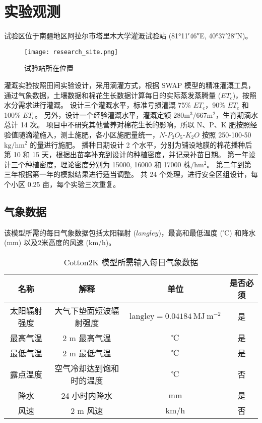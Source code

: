 \section{实验观测}
试验区位于南疆地区阿拉尔市塔里木大学灌溉试验站 (\ang{81;11;46}E, \ang{40;37;28}N)。
\begin{figure}
    \centering
    \texttt{[image: research\_site.png]}
    \caption{试验站所在位置}
\end{figure}
灌溉实验按照田间实验设计，采用滴灌方式，根据 SWAP 模型\cite{swap2021}的精准灌溉工具，通过气象数据，土壤数据和棉花生长数据计算每日的实际蒸发蒸腾量 ($ET_c$)，按照水分需求进行灌溉。
设计三个灌溉水平，标准亏损灌溉 75\% $ET_c$，90\% $ET_c$ 和 100\% $ET_c$。
另外，设计一个经验灌溉水平，灌溉定额 $\mathrm{280 m^3 / 667m^2}$，生育期滴水总计 14 次。
项目中不研究其他营养对棉花生长的影响，所以 N、P、K 肥按照经验值随滴灌施入，测土施肥，各小区施肥量统一，$N$-$P_2O_5$-$K_2O$ 按照 250-100-50 $\mathrm{kg/hm^2}$ 的量进行施肥。
播种日期设计 2 个水平，分别为铺设地膜的棉花播种后第 10 和 15 天，根据出苗率补充到设计的种植密度，并记录补苗日期。
第一年设计三个种植密度，理论密度分别为 15000, 16000 和 17000 株/$\mathrm{hm^2}$。
第二年到第三年根据第一年的模拟结果进行适当调整。
共 24 个处理，进行安全区组设计，每个小区 0.25 亩，每个实验三次重复。

\subsection{气象数据}

该模型所需的每日气象数据包括太阳辐射 ($langley$)，最高和最低温度 (℃) 和降水 (mm) 以及2米高度的风速 (km/h)。

\begin{table}
    \caption{Cotton2K 模型所需输入每日气象数据}\label{tab:meteorology}
    \small
    \centering
    \begin{tabular}{cccc}
        \toprule
        名称         & 解释                     & 单位                                              & 是否必须 \\
        \midrule
        太阳辐射强度 & 大气下垫面短波辐射强度   & $\mathrm{langley} = 0.04184\ \mathrm{MJ\ m^{-2}}$ & 是       \\
        最高气温     & 2 m 最高气温             & ℃                                                 & 是       \\
        最低气温     & 2 m 最低气温             & ℃                                                 & 是       \\
        露点温度     & 空气冷却达到饱和时的温度 & ℃                                                 & 否       \\
        降水         & 24 小时内降水            & mm                                                & 是       \\
        风速         & 2 m 风速                 & km/h                                              & 否       \\
        \bottomrule
    \end{tabular}
\end{table}

